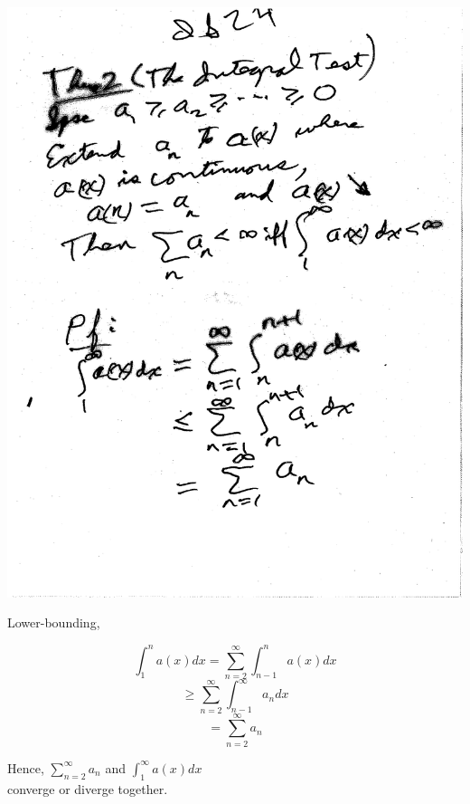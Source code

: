 \documentclass[10pt,a4paper]{article}
\begin{document}
\includegraphics[scale=.5]{Pages/IS_24}

\newpage

\noindent Lower-bounding,

$$ \int_{1}^{n} a(x) dx = \sum_{n=2}^{\infty} \int_{n-1}^{n} a(x) dx$$
$$ \geq \sum_{n=2}^{\infty} \int_{n-1}^{\infty} a_n dx $$
$$ = \sum_{n=2}^{\infty} a_n$$

\noindent Hence, $\sum_{n=2}^{\infty} a_n $ and $ \int_{1}^{\infty} a(x) dx$
\\ converge or diverge together.
\end{document}
